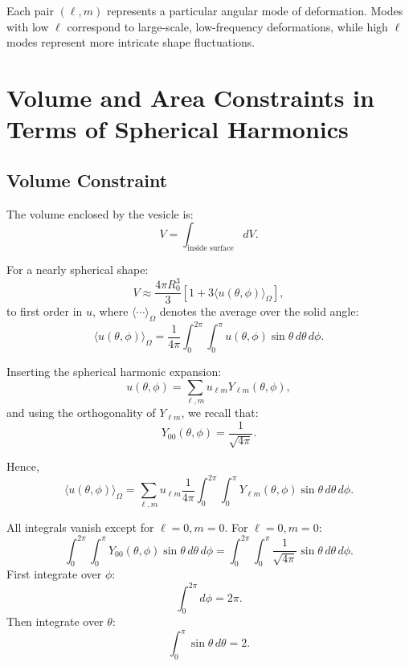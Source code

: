 \documentclass[12pt,a4paper]{article}
\begin{document}
Each pair $(\ell,m)$ represents a particular angular mode of deformation. Modes with low $\ell$ correspond to large-scale, low-frequency deformations, while high $\ell$ modes represent more intricate shape fluctuations.

\section{Volume and Area Constraints in Terms of Spherical Harmonics}

\subsection{Volume Constraint}

The volume enclosed by the vesicle is:
\begin{equation}
V = \int_{\text{inside surface}} dV.
\end{equation}

For a nearly spherical shape:
\begin{equation}
V \approx \frac{4\pi R_0^3}{3} \left[1 + 3\langle u(\theta,\phi)\rangle_{\Omega}\right],
\end{equation}
to first order in $u$, where $\langle \cdots \rangle_{\Omega}$ denotes the average over the solid angle:
\begin{equation}
\langle u(\theta,\phi)\rangle_{\Omega} = \frac{1}{4\pi}\int_0^{2\pi}\int_0^\pi u(\theta,\phi)\sin\theta\,d\theta\,d\phi.
\end{equation}

Inserting the spherical harmonic expansion:
\begin{equation}
u(\theta,\phi) = \sum_{\ell,m} u_{\ell m} Y_{\ell m}(\theta,\phi),
\end{equation}
and using the orthogonality of $Y_{\ell m}$, we recall that:
\begin{equation}
Y_{00}(\theta,\phi) = \frac{1}{\sqrt{4\pi}}.
\end{equation}

Hence,
\begin{equation}
\langle u(\theta,\phi)\rangle_{\Omega} = \sum_{\ell,m} u_{\ell m} \frac{1}{4\pi}\int_0^{2\pi}\int_0^\pi Y_{\ell m}(\theta,\phi)\sin\theta\, d\theta\, d\phi.
\end{equation}

All integrals vanish except for $\ell=0,m=0$. For $\ell=0,m=0$:
\begin{equation}
\int_0^{2\pi}\int_0^\pi Y_{00}(\theta,\phi)\sin\theta\, d\theta\, d\phi = \int_0^{2\pi}\int_0^\pi \frac{1}{\sqrt{4\pi}}\sin\theta\, d\theta\, d\phi.
\end{equation}
First integrate over $\phi$: 
\[
\int_0^{2\pi} d\phi = 2\pi.
\]
Then integrate over $\theta$: 
\[
\int_0^\pi \sin\theta\, d\theta = 2.
\]
\end{document}
